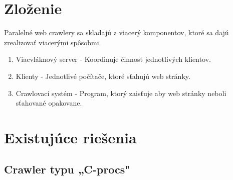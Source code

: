 \documentclass[10pt,twoside,slovak,a4paper]{article}
\begin{document}
\section{Zloženie}

Paralelné web crawlery sa skladajú z viacerý komponentov, ktoré sa dajú zrealizovať viacerými spôsobmi. \cite{9645918} \cite{kausar2013web} %

\begin{enumerate}
	\item Viacvláknový server - Koordinuje činnosť jednotlivých klientov.
	\item Klienty - Jednotlivé počítače, ktoré sťahujú web stránky.
	\item Crawlovací systém - Program, ktorý zaisťuje aby web stránky neboli sťahované opakovane.
\end{enumerate}

\section{Existujúce riešenia}
	\subsection{Crawler typu „C-procs" \cite{sharma2011novel}} %

\newpage

\nocite{*}


\end{document}
